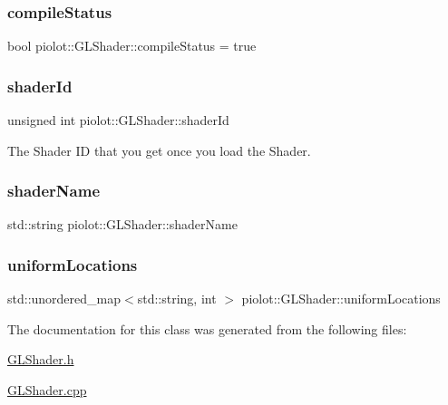 \subsubsection{\texorpdfstring{compile\+Status}{compileStatus}}
{\footnotesize\ttfamily bool piolot\+::\+G\+L\+Shader\+::compile\+Status = true}

\mbox{\label{classpiolot_1_1_g_l_shader_a7f05981084b76212d3ee92c71e002fb2}} 
\subsubsection{\texorpdfstring{shader\+Id}{shaderId}}
{\footnotesize\ttfamily unsigned int piolot\+::\+G\+L\+Shader\+::shader\+Id}



The Shader ID that you get once you load the Shader. 

\mbox{\label{classpiolot_1_1_g_l_shader_af6cacc0e6d324c39ec3b862dc0ff29a8}} 
\subsubsection{\texorpdfstring{shader\+Name}{shaderName}}
{\footnotesize\ttfamily std\+::string piolot\+::\+G\+L\+Shader\+::shader\+Name}

\mbox{\label{classpiolot_1_1_g_l_shader_adde3ba01aacd0c60bd495ca3b220a1dd}} 
\subsubsection{\texorpdfstring{uniform\+Locations}{uniformLocations}}
{\footnotesize\ttfamily std\+::unordered\+\_\+map$<$std\+::string, int $>$ piolot\+::\+G\+L\+Shader\+::uniform\+Locations}



The documentation for this class was generated from the following files\+:\begin{DoxyCompactItemize}
\item 
\mbox{\hyperlink{_g_l_shader_8h}{G\+L\+Shader.\+h}}\item 
\mbox{\hyperlink{_g_l_shader_8cpp}{G\+L\+Shader.\+cpp}}\end{DoxyCompactItemize}
